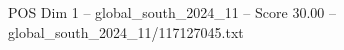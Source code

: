 \begin{textsample}{POS Dim 1 – global\_south\_2024\_11 – Score 30.00 – global\_south\_2024\_11/117127045.txt}
\end{textsample}
